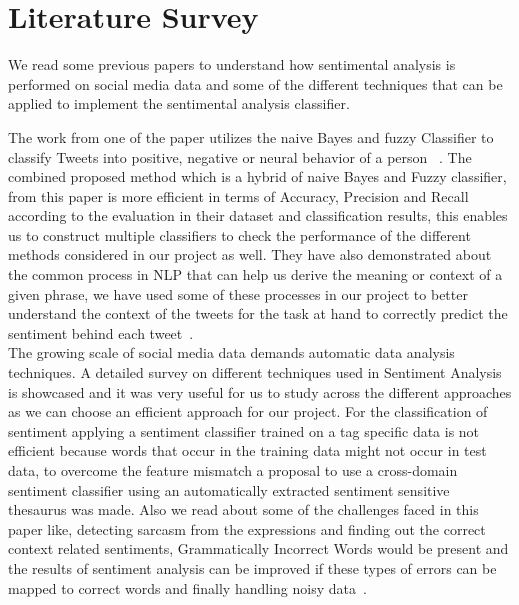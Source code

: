 \section{Literature Survey}
We read some previous papers to understand how sentimental analysis is 
performed on social media data and some of the different techniques that can be 
applied to implement the sentimental analysis classifier.

The work from one of the paper utilizes the naive Bayes and fuzzy Classifier to 
classify Tweets into positive, negative or neural behavior of a person ~\cite{hid-sp18-418-fuzzy-naive}. 
The combined proposed method which is a hybrid of naive Bayes and Fuzzy classifier, 
from this paper is more efficient in terms of Accuracy, Precision and Recall 
according to the evaluation in their dataset and classification 
results, this enables us to construct multiple classifiers to check the 
performance of the different methods considered in our project as 
well. They have also demonstrated about the common process in NLP that can help 
us derive the meaning or context of a given phrase, 
we have used some of these processes in our project to better understand the 
context of the tweets for the task at hand to correctly predict the sentiment 
behind each tweet~\cite{hid-sp18-418-fuzzy-naive}.\\ 
 
The growing scale of social media data demands automatic data analysis techniques. 
A detailed survey on different techniques used in Sentiment Analysis is showcased 
and it was very useful for us to study across the different approaches as we can 
choose an efficient approach for our project. For the classification of sentiment 
applying a sentiment classifier trained on a tag specific data is not efficient 
because words that occur in the training data might not occur in test data, to 
overcome the feature mismatch a proposal to use a cross-domain sentiment classifier 
using an automatically extracted sentiment sensitive thesaurus was made. Also we 
read about some of the challenges faced in this paper like, detecting sarcasm from 
the expressions and finding out the correct context related sentiments, Grammatically 
Incorrect Words would be present and the results of sentiment analysis can be improved 
if these types of errors can be mapped to correct words and finally handling noisy 
data~\cite{hid-sp18-418-sentimental-analysis}. 


